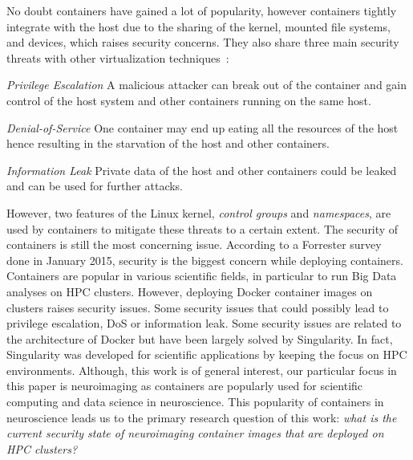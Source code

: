 \documentclass[a4paper,num-refs]{oup-contemporary}
\begin{document}
No doubt containers have gained a lot of popularity, however containers tightly
integrate with the host due to the sharing of the kernel, 
mounted file systems, and devices, which raises security
concerns.
They also share three main security threats with other virtualization
techniques~\cite{gantikow2016providing}:

\textit{Privilege Escalation} A malicious attacker can break out of the container
and gain control of the host system and other containers running on the same host.

\textit{Denial-of-Service} One container may end up eating all the resources of the
host hence resulting in the starvation of the host and other containers.

\textit{Information Leak} Private data of the host and other containers could be
leaked and can be used for further attacks.


However, two features of the Linux kernel, \textit{control groups} and \textit{namespaces},
are used by containers to mitigate these threats to a certain extent. The security
of containers is still the most concerning issue. According to a Forrester survey~\cite{bettini2015vulnerability}
done in January 2015, security is the
biggest concern while deploying containers.
Containers are popular in various scientific fields, in particular to run Big Data analyses
on HPC clusters. 
However, deploying Docker container images on clusters raises security issues. Some security issues 
that could possibly lead to privilege escalation, DoS or information leak. Some
security issues are related to the architecture of Docker but have been 
largely solved by Singularity.
In fact, Singularity was developed for scientific applications
by keeping the focus on HPC environments. Although, this work is of general interest,
our particular focus in this paper is neuroimaging as containers are popularly used for scientific computing and data science
in neuroscience.
This popularity of containers in neuroscience leads us to the
primary research question of this work: \textit{what is the current security state of
neuroimaging container images that are deployed on HPC clusters?}
\end{document}
